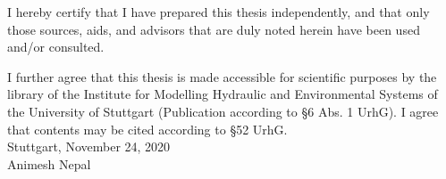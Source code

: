 \newpage
\thispagestyle{empty}

\vspace*{\fill}

I hereby certify that I have prepared this thesis independently, and that only
those sources, aids, and advisors that are duly noted herein have been used
and/or consulted.

I further agree that this thesis is made accessible for scientific purposes by the
library of the Institute for Modelling Hydraulic and Environmental Systems of
the University of Stuttgart (Publication according to {\S}6 Abs. 1 UrhG).
I agree that contents may be cited according to {\S}52 UrhG.\\[1cm]
Stuttgart, November 24, 2020\\[2cm]
Animesh Nepal \\

\endinput